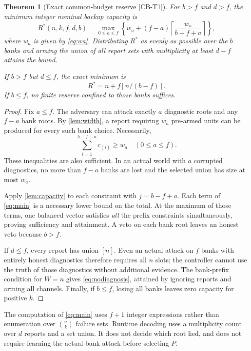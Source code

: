 \documentclass[11pt,a4paper]{article}
\newtheorem{theorem}{Theorem}
\theoremstyle{definition}\newtheorem{definition}{Definition}
\newcommand{\sid}[1]{\textnormal{\textsf{[#1]}}}
\newcommand{\ceil}[1]{\left\lceil #1\right\rceil}
\newcommand{\Rmin}{R^*}
\begin{document}
\begin{theorem}[Exact common-budget reserve \sid{CB-T1}]
\label{thm:frontier}
For $b>f$ and $d>f$, the minimum integer nominal backup capacity is
\begin{equation}
\boxed{\displaystyle
\Rmin(n,k,f,d,b)=\max_{0\leq a\leq f}
\left\{w_a+(f-a)\ceil{\frac{w_a}{b-f+a}}\right\},}
\label{eq:main}
\end{equation}
where $w_a$ is given by \cref{eq:wa}. Distributing $\Rmin$ as evenly as possible over the $b$ banks and arming the union of all report sets with multiplicity at least $d-f$ attains the bound.

If $b>f$ but $d\leq f$, the exact minimum is
\begin{equation}
\label{eq:nodiagnosis}
\Rmin=n+f\ceil{n/(b-f)}.
\end{equation}
If $b\leq f$, no finite reserve confined to those banks suffices.
\end{theorem}
\begin{proof}
Fix $a\leq f$. The adversary can attack exactly $a$ diagnostic roots and any $f-a$ bank roots. By \cref{lem:width}, a report requiring $w_a$ pre-armed units can be produced for every such bank choice. Necessarily,
\begin{equation}
\label{eq:prefix}
\sum_{i=1}^{b-f+a}c_{(i)}\geq w_a\quad(0\leq a\leq f).
\end{equation}
These inequalities are also sufficient. In an actual world with $a$ corrupted diagnostics, no more than $f-a$ banks are lost and the selected union has size at most $w_a$.

Apply \cref{lem:capacity} to each constraint with $j=b-f+a$. Each term of \cref{eq:main} is a necessary lower bound on the total. At the maximum of those terms, one balanced vector satisfies \emph{all} the prefix constraints simultaneously, proving sufficiency and attainment. A veto on each bank root leaves an honest veto because $b>f$.

If $d\leq f$, every report has union $[n]$. Even an actual attack on $f$ banks with entirely honest diagnostics therefore requires all $n$ slots; the controller cannot use the truth of those diagnostics without additional evidence. The bank-prefix condition for $W=n$ gives \cref{eq:nodiagnosis}, attained by ignoring reports and arming all channels. Finally, if $b\leq f$, losing all banks leaves zero capacity for positive $k$.
\end{proof}
The computation of \cref{eq:main} uses $f+1$ integer expressions rather than enumeration over $\binom nk$ failure sets. Runtime decoding uses a multiplicity count over $d$ reports and a set union. It does not decide which root lied, and does not require learning the actual bank attack before selecting $P$.
\end{document}
